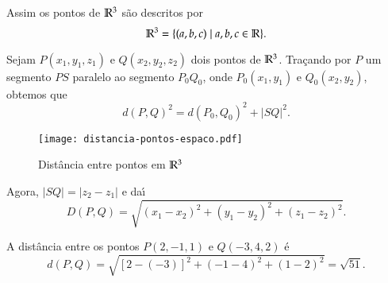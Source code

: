 Assim os pontos de $\mathbb{R}^3$ s\~ao descritos por
\[
  \mathbb{R}^3 = \{(a,b,c)\mid a,b,c \in \mathbb{R}\}.
\]

Sejam $P(x_1,y_1,z_1)$ e $Q(x_2,y_2,z_2)$ dois pontos de $\mathbb{R}^3$. Tra\c{c}ando por $P$ um segmento $PS$ paralelo ao segmento $P_0Q_0$, onde $P_0(x_1,y_1)$ e $Q_0(x_2,y_2)$, obtemos que
\[
  d(P,Q)^2 = d(P_0,Q_0)^2 + |SQ|^2.
\]
\begin{figure}
  \centering
  \caption{Dist\^ancia entre pontos em $\mathbb{R}^3$}
  \texttt{[image: distancia-pontos-espaco.pdf]}
    




\end{figure}

Agora, $|SQ| = |z_2 - z_1|$ e da{\'\i}
\[
  D(P,Q) = \sqrt{(x_1 - x_2)^2 + (y_1 - y_2)^2 + (z_1 - z_2)^2}.
\]

\begin{exemplos}
  A dist\^ancia entre os pontos $P(2,-1,1)$ e $Q(-3,4,2)$ \'e
  \[
    d(P,Q) = \sqrt{[2 - (-3)]^2 + (-1-4)^2 + (1-2)^2} = \sqrt{51}.
  \]
\end{exemplos}


